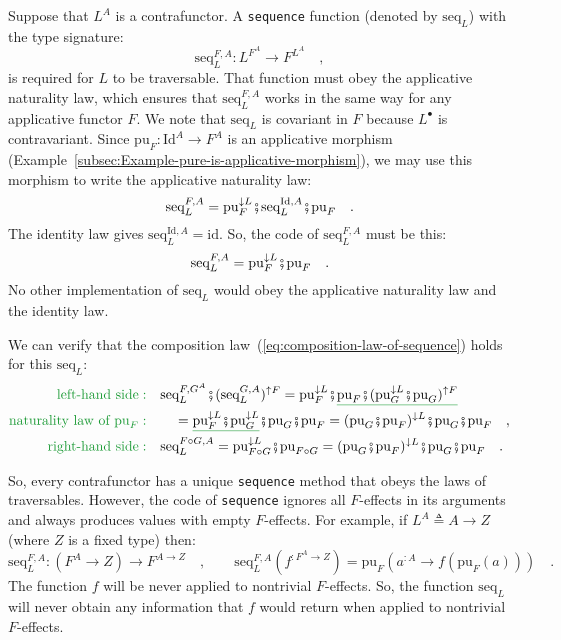 Suppose that $L^{A}$ is a contrafunctor. A \lstinline!sequence!
function (denoted by $\text{seq}_{L}$) with the type signature:
\[
\text{seq}_{L}^{F,A}:L^{F^{A}}\rightarrow F^{L^{A}}\quad,
\]
is required for $L$ to be traversable. That function must obey the
applicative naturality law, which ensures that $\text{seq}_{L}^{F,A}$
works in the same way for any applicative functor $F$. We note that
$\text{seq}_{L}$ is covariant in $F$ because $L^{\bullet}$ is contravariant.
Since $\text{pu}_{F}:\text{Id}^{A}\rightarrow F^{A}$ is an applicative
morphism (Example~\ref{subsec:Example-pure-is-applicative-morphism}),
we may use this morphism to write the applicative naturality law:
\[
\text{seq}_{L}^{F,A}=\text{pu}_{F}^{\downarrow L}\bef\text{seq}_{L}^{\text{Id},A}\bef\text{pu}_{F}\quad.
\]
The identity law gives $\text{seq}_{L}^{\text{Id},A}=\text{id}$.
So, the code of $\text{seq}_{L}^{F,A}$ must be this:
\[
\text{seq}_{L}^{F,A}=\text{pu}_{F}^{\downarrow L}\bef\text{pu}_{F}\quad.
\]
No other implementation of $\text{seq}_{L}$ would obey the applicative
naturality law and the identity law.

We can verify that the composition law~(\ref{eq:composition-law-of-sequence})
holds for this $\text{seq}_{L}$:
\begin{align*}
{\color{greenunder}\text{left-hand side}:}\quad & \text{seq}_{L}^{F,G^{A}}\bef(\text{seq}_{L}^{G,A})^{\uparrow F}=\text{pu}_{F}^{\downarrow L}\bef\gunderline{\text{pu}_{F}\bef(\text{pu}_{G}^{\downarrow L}\bef\text{pu}_{G})^{\uparrow F}}\\
{\color{greenunder}\text{naturality law of }\text{pu}_{F}:}\quad & \quad=\gunderline{\text{pu}_{F}^{\downarrow L}\bef\text{pu}_{G}^{\downarrow L}}\bef\text{pu}_{G}\bef\text{pu}_{F}=(\text{pu}_{G}\bef\text{pu}_{F})^{\downarrow L}\bef\text{pu}_{G}\bef\text{pu}_{F}\quad,\\
{\color{greenunder}\text{right-hand side}:}\quad & \text{seq}_{L}^{F\circ G,A}=\text{pu}_{F\circ G}^{\downarrow L}\bef\text{pu}_{F\circ G}=(\text{pu}_{G}\bef\text{pu}_{F})^{\downarrow L}\bef\text{pu}_{G}\bef\text{pu}_{F}\quad.
\end{align*}

So, every contrafunctor has a unique \lstinline!sequence! method
that obeys the laws of traversables. However, the code of \lstinline!sequence!
ignores all $F$-effects in its arguments and always produces values
with empty $F$-effects. For example, if $L^{A}\triangleq A\rightarrow Z$
(where $Z$ is a fixed type) then:
\[
\text{seq}_{L}^{F,A}:(F^{A}\rightarrow Z)\rightarrow F^{A\rightarrow Z}\quad,\quad\quad\text{seq}_{L}^{F,A}(f^{:F^{A}\rightarrow Z})=\text{pu}_{F}(a^{:A}\rightarrow f(\text{pu}_{F}(a)))\quad.
\]
The function $f$ will be never applied to nontrivial $F$-effects.
So, the function $\text{seq}_{L}$ will never obtain any information
that $f$ would return when applied to nontrivial $F$-effects. 

